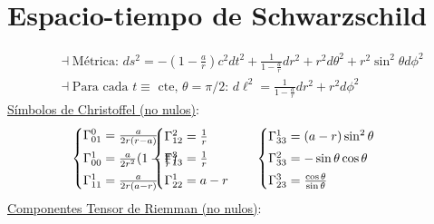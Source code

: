 \section*{Espacio-tiempo de Schwarzschild }
\begin{align*}
    &\dashv\text{Métrica: } ds^2 = -\left(1-\frac{a}{r}\right)c^2dt^2 + \frac{1}{1-\frac{a}{r}}dr^2 + r^2 d\theta^2 + r^2 \sin^2 \theta d\phi^2 \\
    &\dashv\text{Para cada $t\equiv$ cte, $\theta=\pi/2$: $d\ell^2 = \frac{1}{1-\frac{a}{r}}dr^2 + r^2 d\phi ^2 $}
\end{align*}
\underline{Símbolos de Christoffel (no nulos)}: 
\begin{align*}
&\begin{cases} 
\Gamma_{01}^0 =\frac{a}{2r(r-a)} \vspace{3pt} \\
\Gamma_{00}^1 = \frac{a}{2r^2}(1-\frac{a}{r})
\vspace{3pt} \\ 
\Gamma_{11}^1 = \frac{a}{2r(a-r)}
\end{cases}
\hspace{-40pt}
&
\begin{cases} 
\Gamma^2_{12}=\frac{1}{r} \vspace{3pt} 
\\ 
\Gamma_{13}^3 =\frac{1}{r}\vspace{3pt}\\ 
\Gamma_{22}^1=a-r
\end{cases} &
\hspace{10pt}
\begin{cases} 
\Gamma^1_{33}=(a-r)\sin^2 \theta \vspace{3pt} \\ 
\Gamma_{33}^2 = -\sin\theta \cos\theta\vspace{3pt}\\ 
\Gamma_{23}^3 = \frac{\cos\theta}{\sin\theta}
\end{cases}  
\end{align*}
\underline{Componentes Tensor de Riemman (no nulos)}:
